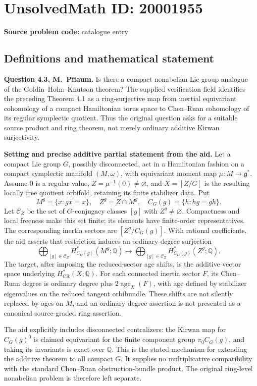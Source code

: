 \documentclass[11pt]{article}
\newcommand{\Q}{\mathbb{Q}}
\begin{document}
\section*{UnsolvedMath ID: 20001955}
\textbf{Source problem code:} catalogue entry
\subsection{Definitions and mathematical statement}
\textbf{Question 4.3, M.~Pflaum.} Is there a compact nonabelian Lie-group analogue of the Goldin--Holm--Knutson theorem? The supplied verification field identifies the preceding Theorem 4.1 as a ring-surjective map from inertial equivariant cohomology of a compact Hamiltonian torus space to Chen--Ruan cohomology of its regular symplectic quotient. Thus the original question asks for a suitable source product and ring theorem, not merely ordinary additive Kirwan surjectivity.

\textbf{Setting and precise additive partial statement from the aid.} Let a compact Lie group $G$, possibly disconnected, act in a Hamiltonian fashion on a compact symplectic manifold $(M,\omega)$, with equivariant moment map $\mu:M\to\mathfrak g^*$. Assume $0$ is a regular value, $Z=\mu^{-1}(0)\ne\varnothing$, and $X=[Z/G]$ is the resulting locally free quotient orbifold, retaining its finite stabilizer data. Put
\[
 M^g=\{x:gx=x\},\quad Z^g=Z\cap M^g,\quad
 C_G(g)=\{h:hg=gh\}.
\]
Let $\mathcal C_Z$ be the set of $G$-conjugacy classes $[g]$ with $Z^g\ne\varnothing$. Compactness and local freeness make this set finite; its elements have finite-order representatives. The corresponding inertia sectors are $[Z^g/C_G(g)]$. With rational coefficients, the aid asserts that restriction induces an ordinary-degree surjection
\[
 \bigoplus_{[g]\in\mathcal C_Z}
 H^*_{C_G(g)}(M^g;\Q)
 \longrightarrow
 \bigoplus_{[g]\in\mathcal C_Z}
 H^*_{C_G(g)}(Z^g;\Q).
\]
The target, after imposing the reduced-sector age shifts, is the additive vector space underlying $H^*_{\mathrm{CR}}(X;\Q)$. For each connected inertia sector $F$, its Chen--Ruan degree is ordinary degree plus $2\operatorname{age}_X(F)$, with age defined by stabilizer eigenvalues on the reduced tangent orbibundle. These shifts are not silently replaced by ages on $M$, and an ordinary-degree assertion is not presented as a canonical source-graded ring assertion.

The aid explicitly includes disconnected centralizers: the Kirwan map for $C_G(g)^0$ is claimed equivariant for the finite component group $\pi_0C_G(g)$, and taking its invariants is exact over $\Q$. This is the stated mechanism for extending the additive theorem to all compact $G$. It supplies no multiplicative compatibility with the standard Chen--Ruan obstruction-bundle product. The original ring-level nonabelian problem is therefore left separate.
\end{document}
